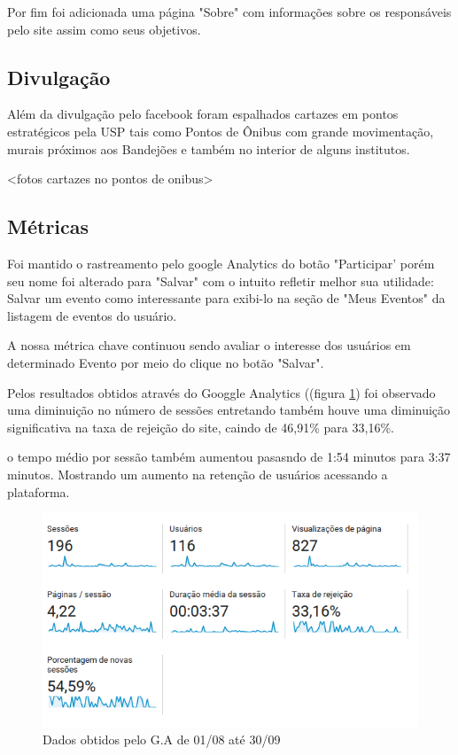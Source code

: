 \par Por fim foi adicionada uma página "Sobre" com informações sobre os responsáveis pelo site assim como seus objetivos.
\subsection{Divulgação}
\par Além da divulgação pelo facebook foram espalhados cartazes em pontos estratégicos pela USP tais como Pontos de Ônibus com grande movimentação, murais próximos aos Bandejões e também no interior de alguns institutos.

<fotos cartazes no pontos de onibus>

\subsection{Métricas}

\par Foi mantido o rastreamento pelo google Analytics do botão "Participar' porém seu nome foi alterado para "Salvar" com o intuito refletir melhor sua utilidade: Salvar um evento como interessante para exibi-lo na seção de "Meus Eventos" da listagem de eventos do usuário.

\par A nossa métrica chave continuou sendo avaliar o interesse dos usuários em determinado Evento por meio do clique no botão "Salvar".

\par Pelos resultados obtidos através do Googgle Analytics ((figura \ref{fig:analytics_2ainteracao_dados}) foi observado uma diminuição no número de sessões entretando também houve uma diminuição significativa na taxa de rejeição do site, caindo de 46,91\% para 33,16\%. 
\par o tempo médio por sessão também aumentou pasasndo de 1:54 minutos para 3:37 minutos. Mostrando um aumento na retenção de usuários acessando a plataforma.
\begin{figure}[htb]
\includegraphics[width=15cm]{figuras/analytics_2ainteracao_dados}
\caption{\label{fig:analytics_2ainteracao_dados} Dados obtidos pelo G.A de 01/08 até 30/09}
\end{figure}

